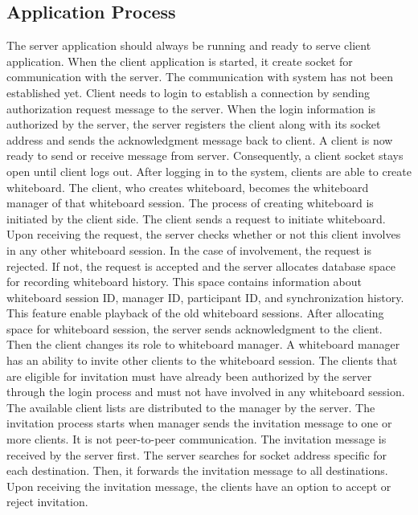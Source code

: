 \documentclass[conference]{IEEEtran}
\begin{document}
\subsection{Application Process}

The server application should always be running and ready to serve client application.
When the client application is started, it create socket for communication with the server. 
The communication with system has not been established yet.  
Client needs to login to establish a connection by sending authorization request message to the server. 
When the login information is authorized by the server, the server registers the client along with its socket address and sends the acknowledgment message back to client. 
A client is now ready to send or receive message from server. 
Consequently, a client socket stays open until client logs out.
After logging in to the system, clients are able to create whiteboard. 
The client, who creates whiteboard, becomes the whiteboard manager of that whiteboard session. 
The process of creating whiteboard is initiated by the client side. 
The client sends a request to initiate whiteboard. 
Upon receiving the request, the server checks whether or not this client involves in any other whiteboard session. 
In the case of involvement, the request is rejected. 
If not, the request is accepted and the server allocates database space for recording whiteboard history. 
This space contains information about whiteboard session ID, manager ID, participant ID, and synchronization history. 
This feature enable playback of the old whiteboard sessions. 
After allocating space for whiteboard session, the server sends acknowledgment to the client. 
Then the client changes its role to whiteboard manager.
A whiteboard manager has an ability to invite other clients to the whiteboard session. 
The clients that are eligible for invitation must have already been authorized by the server through the login process and must not have involved in any whiteboard session.
The available client lists are distributed to the manager by the server. 
The invitation process starts when manager sends the invitation message to one or more clients. It is not peer-to-peer communication. 
The invitation message is received by the server first. 
The server searches for socket address specific for each destination. 
Then, it forwards the invitation message to all destinations. 
Upon receiving the invitation message, the clients have an option to accept or reject invitation. 
\end{document}
